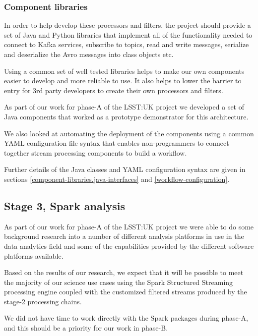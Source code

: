 \documentclass{article}
\newcommand{\yaml} {YAML\xspace}
\newcommand{\avro} {Avro\xspace}
\newcommand{\spark} {Spark\xspace}
\newcommand{\phasea} {phase-A\xspace}
\newcommand{\phaseb} {phase-B\xspace}
\newcommand{\stagetwo} {stage-2\xspace}
\newcommand{\lsstuk} {LSST:UK\xspace}
\begin{document}
\subsubsection{Component libraries}
\label{stage-2.component-libraries}

In order to help develop these processors and filters, the project should provide a set of Java and Python libraries that implement all of the functionality needed to connect to Kafka services, subscribe to topics, read and write messages, serialize and deserialize the \avro messages into class objects etc.

Using a common set of well tested libraries helps to make our own components easier to develop and more reliable to use. It also helps to lower the barrier to entry for 3rd party developers to create their own processors and filters.

As part of our work for \phasea of the \lsstuk project we developed a set of Java components that worked as a prototype demonstrator for this architecture.

We also looked at automating the deployment of the components using a common \yaml configuration file syntax that enables non-programmers to connect together stream processing components to build a workflow.

Further details of the Java classes and \yaml configuration syntax are given in sections \ref{component-libraries.java-interfaces} and \ref{workflow-configuration}.

\subsection{Stage 3, Spark analysis}
\label{stage-3}

As part of our work for \phasea of the \lsstuk project we were able to do some background research into a number of different analysis platforms in use in the data analytics field and some of the capabilities provided by the different software platforms available.

Based on the results of our research, we expect that it will be possible to meet the majority of our science use cases using the Spark Structured Streaming processing engine coupled with the customized filtered streams produced by the \stagetwo processing chains.  

We did not have time to work directly with the \spark packages during \phasea, and this should be a priority for our work in \phaseb.
\end{document}
